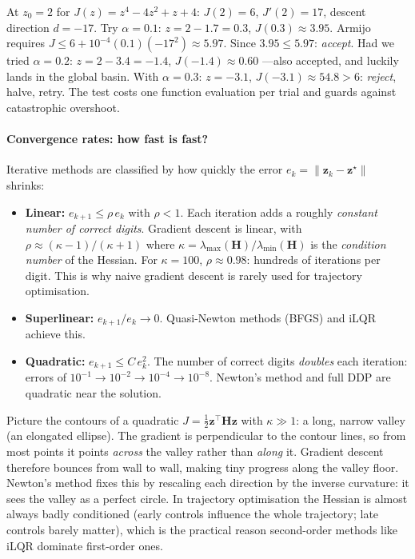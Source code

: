 \documentclass[11pt,twoside]{report}
\theoremstyle{definition}
\theoremstyle{plain}
\theoremstyle{remark}
\newcommand{\0}{\bm{0}}
\begin{document}
\begin{examplebox}
At $z_{0}=2$ for $J(z)=z^{4}-4z^{2}+z+4$: $J(2)=6$, $J'(2)=17$, descent
direction $d=-17$. Try $\alpha=0.1$: $z=2-1.7=0.3$, $J(0.3)\approx 3.95$.
Armijo requires $J\le 6+10^{-4}(0.1)(-17^{2})\approx 5.97$. Since
$3.95\le 5.97$: \emph{accept}.
Had we tried $\alpha=0.2$: $z=2-3.4=-1.4$, $J(-1.4)\approx 0.60$
---also accepted, and luckily lands in the global basin.
With $\alpha=0.3$: $z=-3.1$, $J(-3.1)\approx 54.8>6$: \emph{reject},
halve, retry. The test costs one function evaluation per trial and
guards against catastrophic overshoot.
\end{examplebox}

\paragraph{Convergence rates: how fast is fast?}
Iterative methods are classified by how quickly the error
$e_{k}=\|\bm{z}_{k}-\bm{z}^{\star}\|$ shrinks:
\begin{itemize}
\item \textbf{Linear:} $e_{k+1}\le\rho\,e_{k}$ with $\rho<1$.
      Each iteration adds a roughly \emph{constant number of correct digits}.
      Gradient descent is linear, with
      $\rho\approx(\kappa-1)/(\kappa+1)$ where
      $\kappa=\lambda_{\max}(\bm{H})/\lambda_{\min}(\bm{H})$ is the
      \emph{condition number} of the Hessian.
      For $\kappa=100$, $\rho\approx 0.98$: hundreds of iterations
      per digit. This is why naive gradient descent is rarely used for
      trajectory optimisation.
\item \textbf{Superlinear:} $e_{k+1}/e_{k}\to 0$. Quasi-Newton methods
      (BFGS) and iLQR achieve this.
\item \textbf{Quadratic:} $e_{k+1}\le C\,e_{k}^{2}$.
      The number of correct digits \emph{doubles} each iteration:
      errors of $10^{-1}\to 10^{-2}\to 10^{-4}\to 10^{-8}$.
      Newton's method and full DDP are quadratic near the solution.
\end{itemize}

\begin{insightbox}
Picture the contours of a quadratic $J=\tfrac12\bm{z}^{\!\top}\bm{H}\bm{z}$
with $\kappa\gg 1$: a long, narrow valley (an elongated ellipse).
The gradient is perpendicular to the contour lines, so from most points
it points \emph{across} the valley rather than \emph{along} it.
Gradient descent therefore bounces from wall to wall, making tiny progress
along the valley floor. Newton's method fixes this by rescaling each
direction by the inverse curvature: it sees the valley as a perfect circle.
In trajectory optimisation the Hessian is almost always badly conditioned
(early controls influence the whole trajectory; late controls barely
matter), which is the practical reason second-order methods like
iLQR dominate first-order ones.
\end{insightbox}
\end{document}
